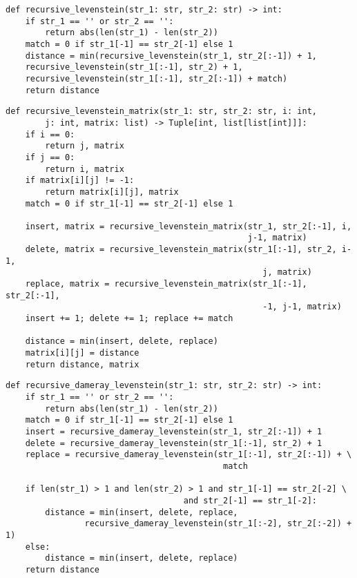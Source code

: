 \begin{lstlisting}[label=some-code,caption=Программный код нахождения расстояния Левенштейна рекурсивно без использования кэша]
def recursive_levenstein(str_1: str, str_2: str) -> int:
	if str_1 == '' or str_2 == '':
		return abs(len(str_1) - len(str_2))
	match = 0 if str_1[-1] == str_2[-1] else 1
	distance = min(recursive_levenstein(str_1, str_2[:-1]) + 1,
	recursive_levenstein(str_1[:-1], str_2) + 1,
	recursive_levenstein(str_1[:-1], str_2[:-1]) + match)
	return distance
\end{lstlisting}

\begin{lstlisting}[label=some-code,caption=Программный код нахождения расстояния Левенштейна рекурсивно с использованием матрицы]
	def recursive_levenstein_matrix(str_1: str, str_2: str, i: int, 
		j: int, matrix: list) -> Tuple[int, list[list[int]]]:
	if i == 0:
		return j, matrix
	if j == 0:
		return i, matrix
	if matrix[i][j] != -1:
		return matrix[i][j], matrix
	match = 0 if str_1[-1] == str_2[-1] else 1
	
	insert, matrix = recursive_levenstein_matrix(str_1, str_2[:-1], i,
												 j-1, matrix)
	delete, matrix = recursive_levenstein_matrix(str_1[:-1], str_2, i-1,
											    	j, matrix)
	replace, matrix = recursive_levenstein_matrix(str_1[:-1], str_2[:-1],
													-1, j-1, matrix)
	insert += 1; delete += 1; replace += match
	
	distance = min(insert, delete, replace)
	matrix[i][j] = distance
	return distance, matrix
\end{lstlisting}

\begin{lstlisting}[label=some-code,caption=Программный код нахождения расстояния Дамерау-Левенштейна рекурсивно]
def recursive_dameray_levenstein(str_1: str, str_2: str) -> int:
	if str_1 == '' or str_2 == '':
		return abs(len(str_1) - len(str_2))
	match = 0 if str_1[-1] == str_2[-1] else 1
	insert = recursive_dameray_levenstein(str_1, str_2[:-1]) + 1
	delete = recursive_dameray_levenstein(str_1[:-1], str_2) + 1
	replace = recursive_dameray_levenstein(str_1[:-1], str_2[:-1]) + \
											match
	
	if len(str_1) > 1 and len(str_2) > 1 and str_1[-1] == str_2[-2] \
									and str_2[-1] == str_1[-2]:
		distance = min(insert, delete, replace,
				recursive_dameray_levenstein(str_1[:-2], str_2[:-2]) + 1)
	else:
		distance = min(insert, delete, replace)
	return distance
\end{lstlisting}

